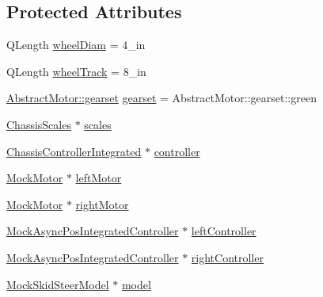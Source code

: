 \subsection*{Protected Attributes}
\begin{DoxyCompactItemize}
\item 
Q\+Length \mbox{\hyperlink{classChassisControllerIntegratedTest_a811fabb44e91b04750fd4f0c3da05845}{wheel\+Diam}} = 4\+\_\+in
\item 
Q\+Length \mbox{\hyperlink{classChassisControllerIntegratedTest_abfdadc8b5c3b1e3a7bf91327aaa13070}{wheel\+Track}} = 8\+\_\+in
\item 
\mbox{\hyperlink{classokapi_1_1AbstractMotor_a88aaa6ea2fa10f5520a537bbf26774d5}{Abstract\+Motor\+::gearset}} \mbox{\hyperlink{classChassisControllerIntegratedTest_add2b6e4322baf60e23ccda6498cbf07d}{gearset}} = Abstract\+Motor\+::gearset\+::green
\item 
\mbox{\hyperlink{classokapi_1_1ChassisScales}{Chassis\+Scales}} $\ast$ \mbox{\hyperlink{classChassisControllerIntegratedTest_a378098f88610ca44252d733af2bfd4a7}{scales}}
\item 
\mbox{\hyperlink{classokapi_1_1ChassisControllerIntegrated}{Chassis\+Controller\+Integrated}} $\ast$ \mbox{\hyperlink{classChassisControllerIntegratedTest_a9947e25a604d3a968e3ad9b916d9e94f}{controller}}
\item 
\mbox{\hyperlink{classokapi_1_1MockMotor}{Mock\+Motor}} $\ast$ \mbox{\hyperlink{classChassisControllerIntegratedTest_aa3408088429fb4788e012ccf45ff6b81}{left\+Motor}}
\item 
\mbox{\hyperlink{classokapi_1_1MockMotor}{Mock\+Motor}} $\ast$ \mbox{\hyperlink{classChassisControllerIntegratedTest_a8b1176ffe2fd2d64f1aab3c8118736bf}{right\+Motor}}
\item 
\mbox{\hyperlink{classokapi_1_1MockAsyncPosIntegratedController}{Mock\+Async\+Pos\+Integrated\+Controller}} $\ast$ \mbox{\hyperlink{classChassisControllerIntegratedTest_ad348d47334b4a1d7fc424014f151545f}{left\+Controller}}
\item 
\mbox{\hyperlink{classokapi_1_1MockAsyncPosIntegratedController}{Mock\+Async\+Pos\+Integrated\+Controller}} $\ast$ \mbox{\hyperlink{classChassisControllerIntegratedTest_a30cbe4fadd9734d6e3137f1ca3274489}{right\+Controller}}
\item 
\mbox{\hyperlink{classokapi_1_1MockSkidSteerModel}{Mock\+Skid\+Steer\+Model}} $\ast$ \mbox{\hyperlink{classChassisControllerIntegratedTest_a0d88a93404b2cae36e74e18edcfdf323}{model}}
\end{DoxyCompactItemize}
